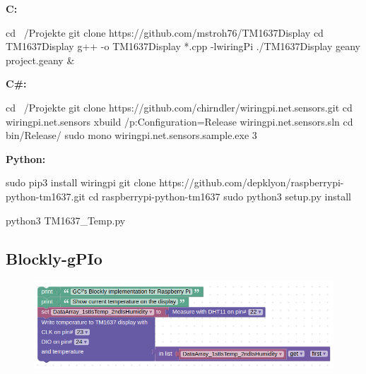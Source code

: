 
\textbf{C:} 

\begin{console}
	cd ~/Projekte
	git clone https://github.com/mstroh76/TM1637Display
	cd TM1637Display
	g++ -o TM1637Display *.cpp -lwiringPi
	./TM1637Display
	geany project.geany & 
\end{console}

\textbf{C\#:}

\begin{console}
	cd ~/Projekte
	git clone https://github.com/chirndler/wiringpi.net.sensors.git
	cd wiringpi.net.sensors
	xbuild /p:Configuration=Release wiringpi.net.sensors.sln
	cd bin/Release/
	sudo mono wiringpi.net.sensors.sample.exe 3
\end{console}

\clearpage
\textbf{Python:}
\begin{console}
	sudo pip3 install wiringpi
	git clone https://github.com/depklyon/raspberrypi-python-tm1637.git
	cd raspberrypi-python-tm1637
	sudo python3 setup.py install
\end{console}

\lstset{language=Python, caption=, 
        label=TM1637Program, frame=single, basicstyle=\ttfamily
	      \footnotesize, breakatwhitespace=false, showstringspaces=false, 
        showtabs=false, tabsize=2 }


\begin{console}
	python3 TM1637_Temp.py
\end{console}

\subsection{Blockly-gPIo}


\begin{figure}[ht]
	\centering
	\includegraphics[scale=0.5]{images/Blockly-gPIo_TM1637.png}
	\label{Blockly-gPIo_TM1637}
\end{figure}

